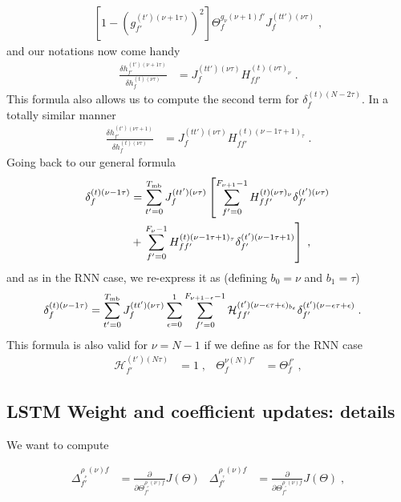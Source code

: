 \begin{subappendices}
\begin{align}
%
\left[1- \left(g^{(t')(\nu+1\tau)}_{f'}\right)^2\right]\Theta^{g_\nu(\nu+1)f'}_{f}
%
J^{(tt')(\nu\tau)}_f\;,
\end{align}
and our notations now come handy
\begin{align}
\frac{\delta h^{(t')(\nu+1\tau)}_{f'}}{\delta h^{(t)(\nu\tau)}_f }&=J^{(tt')(\nu\tau)}_fH^{(t)(\nu\tau)_\nu}_{ff'}\;.
\end{align}
This formula also allows us to compute the second term for $\delta^{(t)(N-2\tau)}_f$. In a totally similar manner
\begin{align}
\frac{\delta h^{(t')(\nu\tau+1)}_{f'}}{\delta h^{(t)(\nu\tau)}_f }&=J^{(tt')(\nu\tau)}_fH^{(t)(\nu-1\tau+1)_\tau}_{ff'}\;.
\end{align}
Going back to our general formula
\begin{align}
\delta^{(t)(\nu-1\tau)}_f&= \sum_{t'=0}^{T_{{\rm mb}}}J^{(tt')(\nu\tau)}_f\left[\sum_{f'=0}^{F_{\nu+1}-1}
%
H^{(t)(\nu\tau)_\nu}_{ff'}\delta^{(t')(\nu\tau)}_{f'}\right.\notag\\
%
&+\left.\sum_{f'=0}^{F_{\nu}-1}H^{(t)(\nu-1\tau+1)_\tau}_{ff'}\delta^{(t')(\nu-1\tau+1)}_{f'}\right]\;,
\end{align}
and as in the RNN case, we re-express it as (defining $b_0=\nu$ and $b_1=\tau$)
\begin{align}
\delta^{(t)(\nu-1\tau)}_f&=
%
\sum_{t'=0}^{T_{{\rm mb}}}J^{(tt')(\nu\tau)}_f\sum_{\epsilon=0}^{1}\sum_{f'=0}^{F_{\nu+1-\epsilon}-1}
%
\mathcal{H}^{(t')(\nu-\epsilon\tau+\epsilon)_{b_\epsilon}}_{ff'}\delta^{(t')(\nu-\epsilon\tau+\epsilon)}_{f'}\;.
\end{align}
This formula is also valid for $\nu =N-1$ if we define as for the RNN case
\begin{align}
\mathcal{H}^{(t')(N\tau)}_{f'}&=1\;,&
%
\Theta^{\nu(N)f'}_{f}&=\Theta^{f'}_{f}\;,
\end{align}



\subsection{LSTM Weight and coefficient updates: details}

We want to compute

\begin{align}
\Delta^{\rho_{_\nu}(\nu)f}_{f'}&=\frac{\partial}{\partial \Theta^{\rho_{_\nu}(\nu)f}_{f'}} J(\Theta)&
%
\Delta^{\rho_{_\tau}(\nu)f}_{f'}&=\frac{\partial}{\partial \Theta^{\rho_{_\tau}(\nu)f}_{f'}} J(\Theta)\;,
\end{align}


\end{subappendices}
